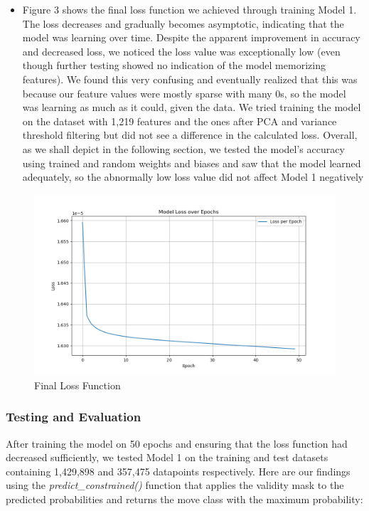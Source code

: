 \documentclass[11pt]{article}
\begin{document}
\begin{itemize}
    \item Figure 3 shows the final loss function we achieved through training Model 1. The loss decreases and gradually becomes asymptotic, indicating that the model was learning over time. Despite the apparent improvement in accuracy and decreased loss, we noticed the loss value was exceptionally low (even though further testing showed no indication of the model memorizing features). We found this very confusing and eventually realized that this was because our feature values were mostly sparse with many 0s, so the model was learning as much as it could, given the data. We tried training the model on the dataset with 1,219 features and the ones after PCA and variance threshold filtering but did not see a difference in the calculated loss. Overall, as we shall depict in the following section, we tested the model's accuracy using trained and random weights and biases and saw that the model learned adequately, so the abnormally low loss value did not affect Model 1 negatively
\end{itemize}

\begin{figure}[H]
    \centering
    \includegraphics[width=0.8\linewidth]{loss1.png}
    \caption{Final Loss Function}
\end{figure}

\subsubsection{Testing and Evaluation}

After training the model on 50 epochs and ensuring that the loss function had decreased sufficiently, we tested Model 1 on the training and test datasets containing 1,429,898 and 357,475 datapoints respectively. Here are our findings using the \emph{predict\_constrained()} function that applies the validity mask to the predicted probabilities and returns the move class with the maximum probability:
\end{document}
